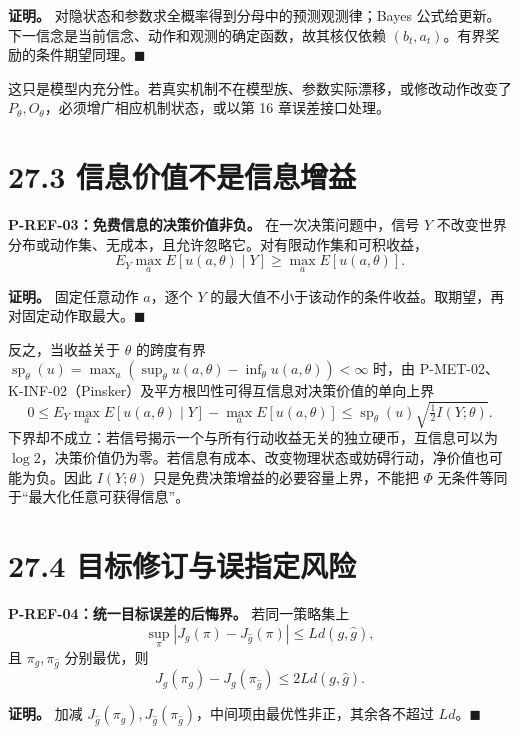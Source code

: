 \documentclass[
  11pt,
  oneside]{book}
\begin{document}
\textbf{证明。} 对隐状态和参数求全概率得到分母中的预测观测律；Bayes 公式给更新。下一信念是当前信念、动作和观测的确定函数，故其核仅依赖 \((b_t,a_t)\)。有界奖励的条件期望同理。\(\blacksquare\)

这只是模型内充分性。若真实机制不在模型族、参数实际漂移，或修改动作改变了 \(P_\theta,O_\theta\)，必须增广相应机制状态，或以第 16 章误差接口处理。

\section{27.3 信息价值不是信息增益}\label{ux4fe1ux606fux4ef7ux503cux4e0dux662fux4fe1ux606fux589eux76ca}

\hypertarget{p-ref-03}{}\label{p-ref-03}

\textbf{P-REF-03：免费信息的决策价值非负。} 在一次决策问题中，信号 \(Y\) 不改变世界分布或动作集、无成本，且允许忽略它。对有限动作集和可积收益， \[E_Y\max_a E[u(a,\theta)\mid Y]
\ge \max_a E[u(a,\theta)].\]

\textbf{证明。} 固定任意动作 \(a\)，逐个 \(Y\) 的最大值不小于该动作的条件收益。取期望，再对固定动作取最大。\(\blacksquare\)

反之，当收益关于 \(\theta\) 的跨度有界 \(\operatorname{sp}_\theta(u)=\max_a(\sup_\theta u(a,\theta)-\inf_\theta u(a,\theta))<\infty\) 时，由 P-MET-02、K-INF-02（Pinsker）及平方根凹性可得互信息对决策价值的单向上界 \[0\le E_Y\max_a E[u(a,\theta)\mid Y]-\max_a E[u(a,\theta)]
\le\operatorname{sp}_\theta(u)\sqrt{\tfrac12 I(Y;\theta)}.\] 下界却不成立：若信号揭示一个与所有行动收益无关的独立硬币，互信息可以为 \(\log2\)，决策价值仍为零。若信息有成本、改变物理状态或妨碍行动，净价值也可能为负。因此 \(I(Y;\theta)\) 只是免费决策增益的必要容量上界，不能把 \(\Phi\) 无条件等同于``最大化任意可获得信息''。

\section{27.4 目标修订与误指定风险}\label{ux76eeux6807ux4feeux8ba2ux4e0eux8befux6307ux5b9aux98ceux9669}

\hypertarget{p-ref-04}{}\label{p-ref-04}

\textbf{P-REF-04：统一目标误差的后悔界。} 若同一策略集上 \[\sup_\pi|J_g(\pi)-J_{\hat g}(\pi)|
\le Ld(g,\hat g),\] 且 \(\pi_g,\pi_{\hat g}\) 分别最优，则 \[J_g(\pi_g)-J_g(\pi_{\hat g})\le2L d(g,\hat g).\]

\textbf{证明。} 加减 \(J_{\hat g}(\pi_g),J_{\hat g}(\pi_{\hat g})\)，中间项由最优性非正，其余各不超过 \(Ld\)。\(\blacksquare\)
\end{document}
